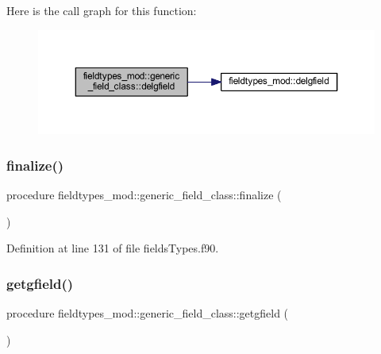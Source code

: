 Here is the call graph for this function\+:\nopagebreak
\begin{figure}[H]
\begin{center}
\leavevmode
\includegraphics[width=350pt]{structfieldtypes__mod_1_1generic__field__class_a14b5aa7f77712f703849552381484eed_cgraph}
\end{center}
\end{figure}
\mbox{\label{structfieldtypes__mod_1_1generic__field__class_ab787d81bd092318c61cb43fe0b255dca}} 
\subsubsection{\texorpdfstring{finalize()}{finalize()}}
{\footnotesize\ttfamily procedure fieldtypes\+\_\+mod\+::generic\+\_\+field\+\_\+class\+::finalize (\begin{DoxyParamCaption}{ }\end{DoxyParamCaption})\hspace{0.3cm}{\ttfamily [private]}}



Definition at line 131 of file fields\+Types.\+f90.

\mbox{\label{structfieldtypes__mod_1_1generic__field__class_a7f87f8c7bbef845b3164831b369c752e}} 
\subsubsection{\texorpdfstring{getgfield()}{getgfield()}}
{\footnotesize\ttfamily procedure fieldtypes\+\_\+mod\+::generic\+\_\+field\+\_\+class\+::getgfield (\begin{DoxyParamCaption}{ }\end{DoxyParamCaption})\hspace{0.3cm}{\ttfamily [private]}}



